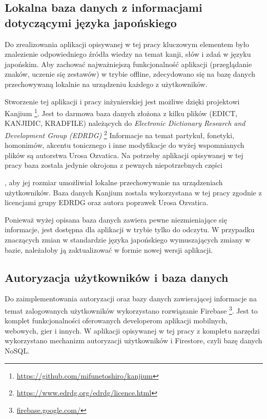 \documentclass[a4paper,twoside,12pt]{book}
\newcommand{\ksremark}[1]{%
{%
{\color{brickred}{[#1]}}}%
\addcontentsline{rks}{uwagas}{\protect{#1}}%
}
\newcommand{\obcy}[1]{\emph{#1}}
\newcommand{\english}[1]{{\selectlanguage{british}\obcy{#1}}}
\begin{document}
\subsection{Lokalna baza danych z informacjami dotyczącymi języka japońskiego}

Do zrealizowania aplikacji opisywanej w tej pracy kluczowym elementem było znalezienie odpowiedniego źródła wiedzy na temat kanji, słów i zdań w języku japońskim. Aby zachować najważniejszą funkcjonalność aplikacji (przeglądanie znaków, uczenie się zestawów) w trybie offline, zdecydowano się na bazę danych przechowywaną lokalnie na urządzeniu każdego z użytkowników. 

Stworzenie tej aplikacji i pracy inżynierskiej jest możliwe dzięki projektowi Kanjium \footnote{\url{https://github.com/mifunetoshiro/kanjium}}. Jest to darmowa baza danych złożona z kilku plików (EDICT, KANJIDIC, KRADFILE) należących do  \english{Electronic Dictionary Research and Development Group (EDRDG)} \footnote{\url{https://www.edrdg.org/edrdg/licence.html}} Informacje na temat partykuł, fonetyki, homonimów, akcentu tonicznego i inne modyfikacje do wyżej wspomnianych plików są autorstwa Urosa Ozvatica. Na potrzeby aplikacji opisywanej w tej pracy baza została jedynie okrojona z pewnych niepotrzebnych części 
\ksremark{np. czego? todo}
, aby jej rozmiar umożliwiał lokalne przechowywanie na urządzeniach użytkowników. Baza danych Kanjium została wykorzystana w tej pracy zgodnie z licencjami grupy EDRDG oraz autora poprawek Urosa Ozvatica.

Ponieważ wyżej opisana baza danych zawiera pewne niezmieniające się informacje, jest dostępna dla aplikacji w trybie tylko do odczytu. W przypadku znaczących zmian w standardzie języka japońskiego wymuszających zmiany w bazie, należałoby ją zaktualizować w formie nowej wersji aplikacji.

\subsection{Autoryzacja użytkowników i baza danych}
Do zaimplementowania autoryzacji oraz bazy danych zawierającej informacje na temat zalogowanych użytkowników wykorzystano rozwiązanie Firebase \footnote{\url{firebase.google.com/}}. Jest to komplet funkcjonalności oferowanych developerom aplikacji mobilnych, webowych, gier i innych. W aplikacji opisywanej w tej pracy z kompletu narzędzi wykorzystano mechanizm autoryzacji użytkowników i Firestore, czyli bazę danych NoSQL. 
\end{document}
